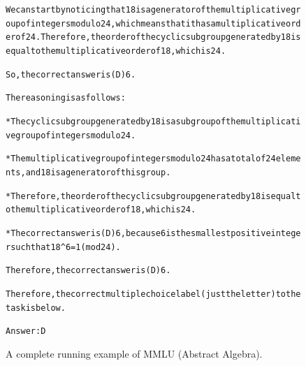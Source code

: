 \begin{figure}[t]
{{\begin{alltt}
We can start by noticing that 18 is a generator of the multiplicative group of integers modulo 24, which means that it has a multiplicative order of 24. Therefore, the order of the cyclic subgroup generated by 18 is equal to the multiplicative order of 18, which is 24.

So, the correct answer is (D) 6.

The reasoning is as follows:

* The cyclic subgroup generated by 18 is a subgroup of the multiplicative group of integers modulo 24.

* The multiplicative group of integers modulo 24 has a total of 24 elements, and 18 is a generator of this group.

* Therefore, the order of the cyclic subgroup generated by 18 is equal to the multiplicative order of 18, which is 24.

* The correct answer is (D) 6, because 6 is the smallest positive integer such that 18\^{}6 = 1 (mod 24).

Therefore, the correct answer is (D) 6.

Therefore, the correct multiple choice label (just the letter) to the task is below.

Answer: D
\end{alltt}
}}
\caption{A complete running example of MMLU (Abstract Algebra).}
\label{fig:mmlu_subject=abstract_algebra_example}
\end{figure}
